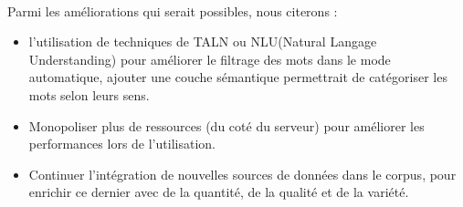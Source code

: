 \documentclass[]{report}
\begin{document}
		\paragraph{}
		Parmi les améliorations qui serait possibles, nous citerons :
		\begin{itemize}
			\item l'utilisation de techniques de TALN ou NLU(Natural Langage Understanding) pour améliorer le filtrage des mots dans le mode automatique, ajouter une couche sémantique permettrait de catégoriser les mots selon leurs sens.
			\item Monopoliser plus de ressources (du coté du serveur) pour améliorer les performances lors de l'utilisation.
			\item Continuer l'intégration de nouvelles sources  de données dans le corpus, pour enrichir ce dernier avec de la quantité, de la qualité et de la variété. 
		\end{itemize}


\end{document}
